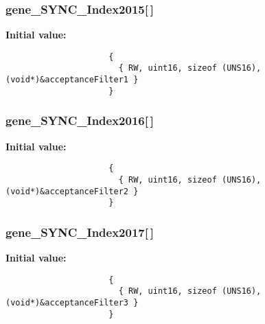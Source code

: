 \subsubsection{ {\bf gene\_\-SYNC\_\-Index2015}[$\,$]}\label{objdict_8c_eac787713603edde51127e84c7488c88}


\textbf{Initial value:}

\begin{Code}\begin{verbatim} 
                     {
                       { RW, uint16, sizeof (UNS16), (void*)&acceptanceFilter1 }
                     }
\end{verbatim}\end{Code}
\subsubsection{ {\bf gene\_\-SYNC\_\-Index2016}[$\,$]}\label{objdict_8c_fb0106f83f562ddb0e9e687497f02462}


\textbf{Initial value:}

\begin{Code}\begin{verbatim} 
                     {
                       { RW, uint16, sizeof (UNS16), (void*)&acceptanceFilter2 }
                     }
\end{verbatim}\end{Code}
\subsubsection{ {\bf gene\_\-SYNC\_\-Index2017}[$\,$]}\label{objdict_8c_eda396214acee841a34d6d4514896242}


\textbf{Initial value:}

\begin{Code}\begin{verbatim} 
                     {
                       { RW, uint16, sizeof (UNS16), (void*)&acceptanceFilter3 }
                     }
\end{verbatim}\end{Code}
